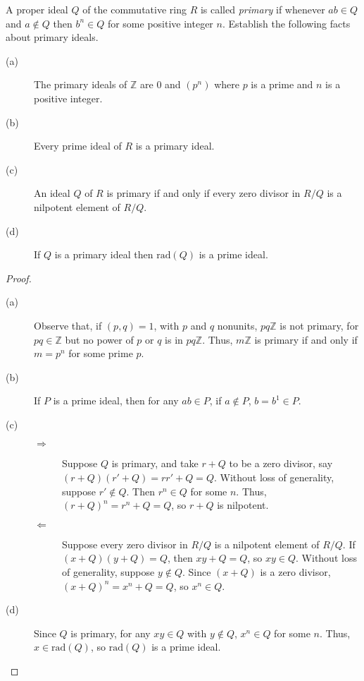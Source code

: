 \documentclass[12pt,leqno]{book}
\numberwithin{equation}{section}
\newcommand{\question}[2] {\vspace{.25in}\noindent\fbox{#1} #2 \vspace{.10in}}
\theoremstyle{definition}
\begin{document}
\question{41}{A proper ideal $Q$ of the commutative ring $R$ is called \textit{primary} if whenever $ab\in Q$ and $a\notin Q$ then $b^n\in Q$ for some positive integer $n$. Establish the following facts about primary ideals.}
\begin{description}
 \item [(a)] The primary ideals of $\mathbb{Z}$ are 0 and $(p^n)$ where $p$ is a prime and $n$ is a positive integer.
 \item [(b)] Every prime ideal of $R$ is a primary ideal.
 \item [(c)] An ideal $Q$ of $R$ is primary if and only if every zero divisor in $R/Q$ is a nilpotent element of $R/Q$.
 \item [(d)] If $Q$ is a primary ideal then $\text{rad}(Q)$ is a prime ideal.
\end{description}
 
\begin{proof}\indent
 \begin{description}
  \item [(a)] Observe that, if $(p,q)=1$, with $p$ and $q$ nonunits, $pq\mathbb{Z}$ is not primary, for $pq\in\mathbb{Z}$ but no power of $p$ or $q$ is in $pq\mathbb{Z}$. Thus, $m\mathbb{Z}$ is primary if and only if $m=p^n$ for some prime $p$.
  \item [(b)] If $P$ is a prime ideal, then for any $ab\in P$, if $a\notin P$, $b=b^1\in P$.
  \item [(c)] \begin{description}
               \item [$\Rightarrow$] Suppose $Q$ is primary, and take $r+Q$ to be a zero divisor, say $(r+Q)(r'+Q)=rr'+Q=Q$. Without loss of generality, suppose $r'\notin Q$. Then $r^n\in Q$ for some $n$. Thus, $(r+Q)^n=r^n+Q=Q$, so $r+Q$ is nilpotent.
	       \item [$\Leftarrow$] Suppose every zero divisor in $R/Q$ is a nilpotent element of $R/Q$. If $(x+Q)(y+Q)=Q$, then $xy+Q=Q$, so $xy\in Q$. Without loss of generality, suppose $y\notin Q$. Since $(x+Q)$ is a zero divisor, $(x+Q)^n=x^n+Q=Q$, so $x^n\in Q$.
              \end{description}
  \item [(d)] Since $Q$ is primary, for any $xy\in Q$ with $y\notin Q$, $x^n\in Q$ for some $n$. Thus, $x\in\text{rad}(Q)$, so $\text{rad}(Q)$ is a prime ideal.\qedhere
 \end{description}

\end{proof}
\end{document}
